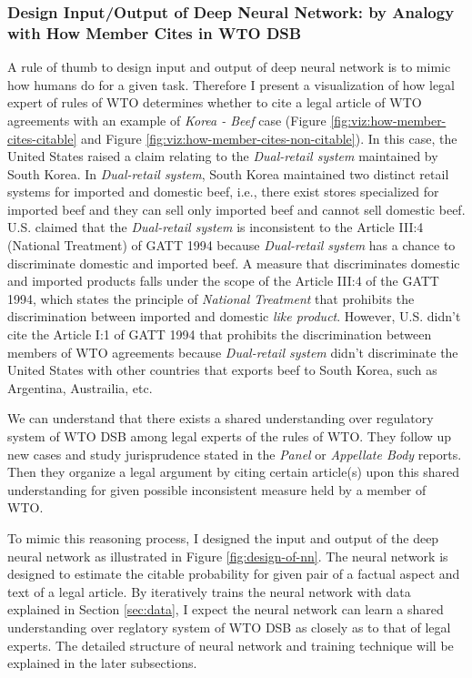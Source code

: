 \documentclass[12pt,letterpaper]{article}
\begin{document}
\subsubsection{Design Input/Output of Deep Neural Network: by Analogy with How Member Cites in WTO DSB} \label{design:io}
A rule of thumb to design input and output of deep neural network is to mimic
how humans do for a given task.
Therefore I present a visualization of how legal expert of rules of WTO determines whether to cite a legal article of WTO agreements with an example of \textit{Korea - Beef} case (Figure \ref{fig:viz:how-member-cites-citable} and Figure \ref{fig:viz:how-member-cites-non-citable}).
In this case, the United States raised a claim relating to the \textit{Dual-retail system} maintained by South Korea. In \textit{Dual-retail system}, South Korea maintained two distinct retail systems
for imported and domestic beef, i.e., there exist stores specialized for imported beef and they can sell only imported beef and cannot sell domestic beef. U.S. claimed that the \textit{Dual-retail system} is inconsistent to the Article III:4 (National Treatment) of GATT 1994
because \textit{Dual-retail system} has a chance to discriminate domestic and imported beef. A measure that discriminates domestic and imported products falls under the scope of the Article III:4 of the GATT 1994, which states the principle of \textit{National Treatment} that prohibits the discrimination between imported and domestic \textit{like product}. However, U.S. didn't
cite the Article I:1 of GATT 1994 that prohibits the discrimination between members of WTO agreements
because \textit{Dual-retail system} didn't discriminate the United States with other countries that exports beef to South Korea, such as Argentina, Austrailia, etc.

We can understand that there exists a shared understanding over regulatory system of WTO DSB among legal experts of the rules of WTO. They follow up new cases and study jurisprudence stated in the \textit{Panel} or  \textit{Appellate Body} reports.
Then they organize a legal argument by citing certain article(s) upon this shared understanding for given possible inconsistent measure held by a member of WTO.

To mimic this reasoning process, I designed the input and output of the deep neural network as illustrated in Figure \ref{fig:design-of-nn}.
The neural network is designed to estimate the citable probability for given pair of a factual aspect and text of a legal article.
By iteratively trains the neural network with data explained in Section \ref{sec:data}, I expect the neural network can learn a shared understanding over reglatory system of WTO DSB as closely as to that of legal experts.
The detailed structure of neural network and training technique will be explained in the later subsections.
\end{document}

